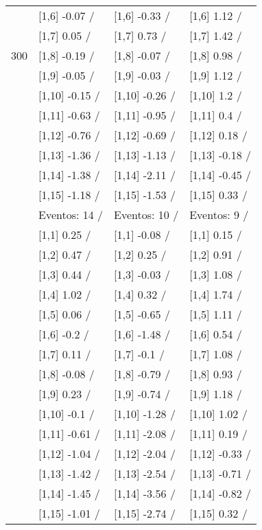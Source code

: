 \begin{table}
\begin{tabular}[t]{llll}
 & {}[1,6] -0.07  / & {}[1,6] -0.33  / & {}[1,6] 1.12  /\\
 & {}[1,7] 0.05  / & {}[1,7] 0.73  / & {}[1,7] 1.42  /\\
300 & {}[1,8] -0.19  / & {}[1,8] -0.07  / & {}[1,8] 0.98  /\\
\addlinespace
 & {}[1,9] -0.05  / & {}[1,9] -0.03  / & {}[1,9] 1.12  /\\
 & {}[1,10] -0.15  / & {}[1,10] -0.26  / & {}[1,10] 1.2  /\\
 & {}[1,11] -0.63  / & {}[1,11] -0.95  / & {}[1,11] 0.4  /\\
 & {}[1,12] -0.76  / & {}[1,12] -0.69  / & {}[1,12] 0.18  /\\
 & {}[1,13] -1.36  / & {}[1,13] -1.13  / & {}[1,13] -0.18  /\\
\addlinespace
 & {}[1,14] -1.38  / & {}[1,14] -2.11  / & {}[1,14] -0.45  /\\
 & {}[1,15] -1.18  / & {}[1,15] -1.53  / & {}[1,15] 0.33  /\\
 & Eventos:  14 / & Eventos:  10 / & Eventos:  9 /\\
 & {}[1,1] 0.25  / & {}[1,1] -0.08  / & {}[1,1] 0.15  /\\
 & {}[1,2] 0.47  / & {}[1,2] 0.25  / & {}[1,2] 0.91  /\\
\addlinespace
 & {}[1,3] 0.44  / & {}[1,3] -0.03  / & {}[1,3] 1.08  /\\
 & {}[1,4] 1.02  / & {}[1,4] 0.32  / & {}[1,4] 1.74  /\\
 & {}[1,5] 0.06  / & {}[1,5] -0.65  / & {}[1,5] 1.11  /\\
 & {}[1,6] -0.2  / & {}[1,6] -1.48  / & {}[1,6] 0.54  /\\
 & {}[1,7] 0.11  / & {}[1,7] -0.1  / & {}[1,7] 1.08  /\\
\addlinespace
500 & {}[1,8] -0.08  / & {}[1,8] -0.79  / & {}[1,8] 0.93  /\\
 & {}[1,9] 0.23  / & {}[1,9] -0.74  / & {}[1,9] 1.18  /\\
 & {}[1,10] -0.1  / & {}[1,10] -1.28  / & {}[1,10] 1.02  /\\
 & {}[1,11] -0.61  / & {}[1,11] -2.08  / & {}[1,11] 0.19  /\\
 & {}[1,12] -1.04  / & {}[1,12] -2.04  / & {}[1,12] -0.33  /\\
\addlinespace
 & {}[1,13] -1.42  / & {}[1,13] -2.54  / & {}[1,13] -0.71  /\\
 & {}[1,14] -1.45  / & {}[1,14] -3.56  / & {}[1,14] -0.82  /\\
 & {}[1,15] -1.01  / & {}[1,15] -2.74  / & {}[1,15] 0.32  /\\
\bottomrule
\end{tabular}
\end{table}
